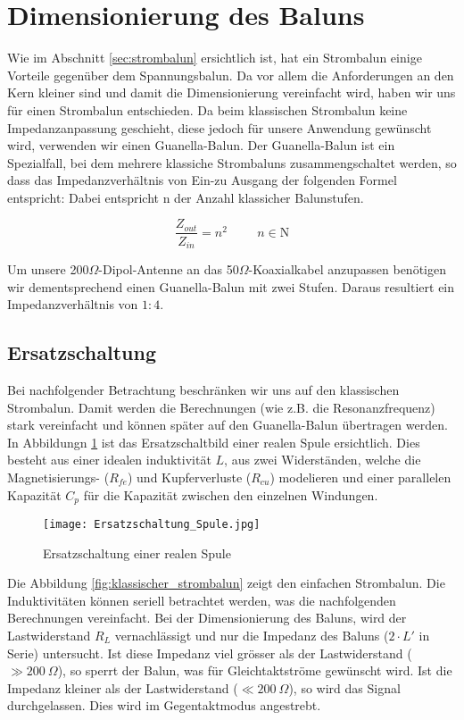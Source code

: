 \section{Dimensionierung des Baluns}

Wie im Abschnitt \ref{sec:strombalun} ersichtlich ist, hat ein Strombalun einige Vorteile gegenüber dem Spannungsbalun. Da vor allem die Anforderungen an den Kern kleiner sind und damit die Dimensionierung vereinfacht wird, haben wir uns für einen Strombalun entschieden. Da beim klassischen Strombalun keine Impedanzanpassung geschieht, diese jedoch für unsere Anwendung gewünscht wird, verwenden wir einen Guanella-Balun. Der Guanella-Balun ist ein Spezialfall, bei dem mehrere klassiche Strombaluns zusammengschaltet werden, so dass das Impedanzverhältnis von Ein-zu Ausgang der folgenden Formel entspricht:
Dabei entspricht n der Anzahl klassicher Balunstufen.

\begin{equation}
	\frac{Z_{out}}{Z_{in}}=n^{2} \hspace{1cm} n\in\mathrm{N}
\end{equation}

Um unsere 200$\Omega$-Dipol-Antenne an das 50$\Omega$-Koaxialkabel anzupassen benötigen wir dementsprechend einen Guanella-Balun mit zwei Stufen. Daraus resultiert ein Impedanzverhältnis von \(1:4\).

\subsection{Ersatzschaltung}
Bei nachfolgender Betrachtung beschränken wir uns auf den klassischen Strombalun. Damit werden die Berechnungen (wie z.B. die Resonanzfrequenz) stark vereinfacht und können später auf den Guanella-Balun übertragen werden. In Abbildungn \ref{fig:ersatz_spule} ist das Ersatzschaltbild einer realen Spule ersichtlich. Dies besteht aus einer idealen induktivität $L$, aus zwei Widerständen, welche die Magnetisierungs- ($R_{fe}$) und Kupferverluste ($R_{cu}$) modelieren und einer parallelen Kapazität $C_{p}$ für die Kapazität zwischen den einzelnen Windungen.

\begin{figure}[H]
	\centering
	\texttt{[image: Ersatzschaltung\_Spule.jpg]}
	\caption{Ersatzschaltung einer realen Spule}\label{fig:ersatz_spule}
\end{figure}

Die Abbildung \ref{fig:klassischer_strombalun} zeigt den einfachen Strombalun. Die Induktivitäten können seriell betrachtet werden, was die nachfolgenden Berechnungen vereinfacht. Bei der Dimensionierung des Baluns, wird der Lastwiderstand $R_{L}$ vernachlässigt und nur die Impedanz des Baluns ($2\cdot L'$ in Serie) untersucht. Ist diese Impedanz viel grösser als der Lastwiderstand ($\gg \SI{200}{\Omega}$), so sperrt der Balun, was für Gleichtaktströme gewünscht wird. Ist die Impedanz kleiner als der Lastwiderstand ($\ll \SI{200}{\Omega}$), so  wird das Signal durchgelassen. Dies wird im Gegentaktmodus angestrebt.

